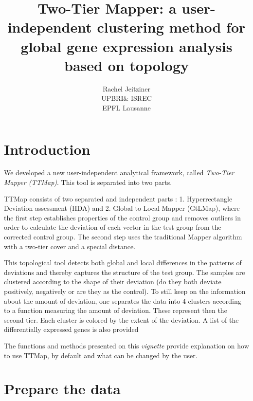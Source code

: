 \documentclass[a4paper,12pt]{article}
\begin{document}
\title{\textbf{\LARGE{Two-Tier Mapper: a user-independent clustering method for global gene expression analysis based on topology}}}
\author{Rachel Jeitziner\\
\small{UPBRI\& ISREC} \\
\small{EPFL Lausanne}}
\date{}  %
\maketitle

\tableofcontents

\section{Introduction}
\label{sec:intro}

We developed a new user-independent analytical framework, called \textit{Two-Tier Mapper (TTMap)}. This tool is separated into two parts. 

TTMap consists of two separated and independent parts : 1. Hyperrectangle Deviation assessment (HDA) and 2. Global-to-Local Mapper (GtLMap), where the first step establishes properties of the control group and removes outliers in order to calculate the deviation of each vector in the test group from the corrected control group. The second step uses the traditional Mapper algorithm \cite{Extracting} with a two-tier cover and a special distance. 

This topological tool detects both global and local differences in the patterns of deviations and thereby captures the structure of the test group. The samples are clustered according to the shape of their deviation (do they both deviate positively, negatively or are they as the control). To still keep on the information about the amount of deviation, one separates the data into 4 clusters according to a function measuring the amount of deviation. These represent then the second tier. 
Each cluster is colored by the extent of the deviation. A list of the differentially expressed genes is also provided 

The functions and methods presented on this \textit{vignette} provide
explanation on how to use TTMap, by default and what can be changed by the user. 
\section{Prepare the data}
\label{sec:intro}
\end{document}
